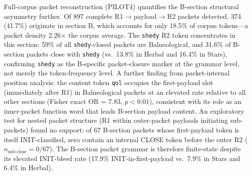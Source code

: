 \documentclass[11pt,a4paper,twocolumn]{article}
\begin{document}
Full-corpus packet reconstruction (PILOT4) quantifies the B-section structural asymmetry further. Of 897 complete R1$\to$payload$\to$R2 packets detected, 374 (41.7\%) originate in section B, which accounts for only 18.5\% of corpus tokens---a packet density 2.26$\times$ the corpus average. The \texttt{shedy} R2 token concentrates in this section: 59\% of all \texttt{shedy}-closed packets are Balneological, and 31.6\% of B-section packets close with \texttt{shedy} (vs.\ 13.8\% in Herbal and 16.4\% in Stars), confirming \texttt{shedy} as the B-specific packet-closure marker at the grammar level, not merely the token-frequency level. A further finding from packet-internal position analysis: the content token \texttt{qol} occupies the first-payload slot (immediately after R1) in Balneological packets at an elevated rate relative to all other sections (Fisher exact OR = 7.83, $p < 0.01$), consistent with its role as an inner-packet function word that leads B-section payload content. An exploratory test for nested packet structure (R1 within outer-packet payloads initiating sub-packets) found no support: of 67 B-section packets whose first-payload token is itself INIT-classified, zero contain an internal CLOSE token before the outer R2 ($n_{\text{sub-close}} = 0/67$). The B-section packet grammar is therefore finite-state despite its elevated INIT-bleed rate (17.9\% INIT-in-first-payload vs.\ 7.9\% in Stars and 6.4\% in Herbal).
\end{document}
